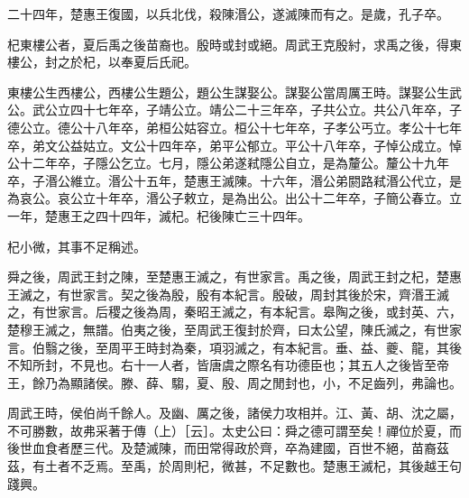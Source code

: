 \begin{pinyinscope}
二十四年，楚惠王復國，以兵北伐，殺陳湣公，遂滅陳而有之。是歲，孔子卒。

杞東樓公者，夏后禹之後苗裔也。殷時或封或絕。周武王克殷紂，求禹之後，得東樓公，封之於杞，以奉夏后氏祀。

東樓公生西樓公，西樓公生題公，題公生謀娶公。謀娶公當周厲王時。謀娶公生武公。武公立四十七年卒，子靖公立。靖公二十三年卒，子共公立。共公八年卒，子德公立。德公十八年卒，弟桓公姑容立。桓公十七年卒，子孝公丐立。孝公十七年卒，弟文公益姑立。文公十四年卒，弟平公郁立。平公十八年卒，子悼公成立。悼公十二年卒，子隱公乞立。七月，隱公弟遂弒隱公自立，是為釐公。釐公十九年卒，子湣公維立。湣公十五年，楚惠王滅陳。十六年，湣公弟閼路弒湣公代立，是為哀公。哀公立十年卒，湣公子敕立，是為出公。出公十二年卒，子簡公春立。立一年，楚惠王之四十四年，滅杞。杞後陳亡三十四年。

杞小微，其事不足稱述。

舜之後，周武王封之陳，至楚惠王滅之，有世家言。禹之後，周武王封之杞，楚惠王滅之，有世家言。契之後為殷，殷有本紀言。殷破，周封其後於宋，齊湣王滅之，有世家言。后稷之後為周，秦昭王滅之，有本紀言。皋陶之後，或封英、六，楚穆王滅之，無譜。伯夷之後，至周武王復封於齊，曰太公望，陳氏滅之，有世家言。伯翳之後，至周平王時封為秦，項羽滅之，有本紀言。垂、益、夔、龍，其後不知所封，不見也。右十一人者，皆唐虞之際名有功德臣也；其五人之後皆至帝王，餘乃為顯諸侯。滕、薛、騶，夏、殷、周之閒封也，小，不足齒列，弗論也。

周武王時，侯伯尚千餘人。及幽、厲之後，諸侯力攻相并。江、黃、胡、沈之屬，不可勝數，故弗采著于傳（上）［云］。太史公曰：舜之德可謂至矣！禪位於夏，而後世血食者歷三代。及楚滅陳，而田常得政於齊，卒為建國，百世不絕，苗裔茲茲，有土者不乏焉。至禹，於周則杞，微甚，不足數也。楚惠王滅杞，其後越王句踐興。


\end{pinyinscope}